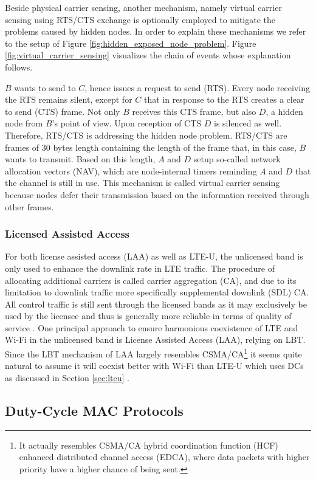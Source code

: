 Beside physical carrier sensing, another mechanism, namely virtual carrier sensing using RTS/CTS exchange is optionally employed to mitigate the problems caused by hidden nodes. In order to explain these mechanisms we refer to the setup of Figure \ref{fig:hidden_exposed_node_problem}. Figure \ref{fig:virtual_carrier_sensing} visualizes the chain of events whose explanation follows.

$B$ wants to send to $C$, hence issues a request to send (RTS). Every node receiving the RTS remains silent, except for $C$ that in response to the RTS creates a clear to send (CTS) frame. Not only $B$ receives this CTS frame, but also $D$, a hidden node from $B$'s point of view. Upon reception of CTS $D$ is silenced as well. Therefore, RTS/CTS is addressing the hidden node problem. RTS/CTS are frames of 30 bytes length containing the length of the frame that, in this case, $B$ wants to transmit. Based on this length, $A$ and $D$ setup so-called network allocation vectors (NAV), which are node-internal timers reminding $A$ and $D$ that the channel is still in use. This mechanism is called virtual carrier sensing because nodes defer their transmission based on the information received through other frames.

\subsubsection{Licensed Assisted Access}
For both license assisted access (LAA) as well as LTE-U, the unlicensed band is only used to enhance the downlink rate in LTE traffic. The procedure of allocating additional carriers is called carrier aggregation (CA), and due to its limitation to downlink traffic more specifically supplemental downlink (SDL) CA. All control traffic is still sent through the licensed bands as it may exclusively be used by the licensee and thus is generally more reliable in terms of quality of service \cite{qualcomm15}.
One principal approach to ensure harmonious coexistence of LTE and Wi-Fi in the unlicensed band is License Assisted Access (LAA), relying on LBT. Since the LBT mechanism of LAA largely resembles CSMA/CA\footnote{It  actually resembles CSMA/CA hybrid coordination function (HCF) enhanced distributed channel access (EDCA), where data packets with higher priority have a higher chance of being sent.} it seems quite natural to assume it will coexist better with Wi-Fi than LTE-U which uses DCs as discussed in Section \ref{sec:lteu} \cite{kwon17}.

\subsection{Duty-Cycle MAC Protocols} \label{sec:duty-cycle-mac}  

